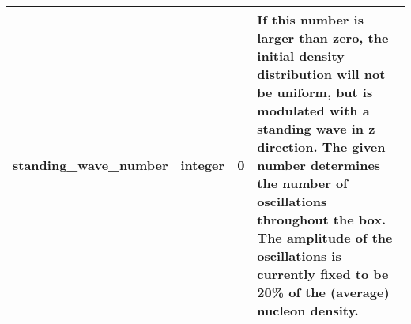 \documentclass{article}
\begin{document}
\begin{longtable}{llll}
\midrule
standing\_wave\_number & \begin{minipage}[t]{2cm}integer\end{minipage} & \begin{minipage}[t]{2cm}0\end{minipage} & \begin{minipage}[t]{12cm}If this number is larger than zero, the initial density distribution will not be uniform, but is modulated with a standing wave in z direction. The given number determines the number of oscillations throughout the box. The amplitude of the oscillations is currently fixed to be 20\% of the (average) nucleon density.\end{minipage}\\*
\bottomrule
\end{longtable}
{ }



\end{document}
